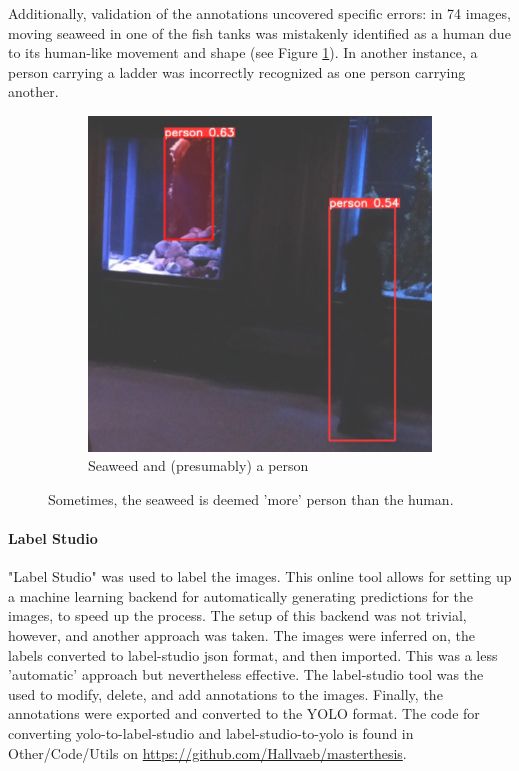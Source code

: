 Additionally, validation of the annotations uncovered specific errors: in 74 images, moving seaweed in one of the fish tanks was mistakenly identified as a human due to its human-like movement and shape (see Figure \ref{fig:seaweed_man}). In another instance, a person carrying a ladder was incorrectly recognized as one person carrying another.

\begin{figure}[H]
    \centering
    \begin{subfigure}{0.60\textwidth}
        \centering
        \includegraphics[width=\textwidth]{Images/Fun/seaweed-man-more-than-I.png}
        \caption{Seaweed and (presumably) a person}
    \end{subfigure}
    \caption{Sometimes, the seaweed is deemed 'more' person than the human.}
    \label{fig:seaweed_man}
\end{figure}

\paragraph{Label Studio}
"Label Studio" was used to label the images. This online tool allows for setting up a machine learning backend for automatically generating predictions for the images, to speed up the process. The setup of this backend was not trivial, however, and another approach was taken. The images were inferred on, the labels converted to label-studio json format, and then imported. This was a less 'automatic' approach but nevertheless effective. The label-studio tool was the used to modify, delete, and add annotations to the images. Finally, the annotations were exported and converted to the YOLO format. The code for converting yolo-to-label-studio and label-studio-to-yolo is found in Other/Code/Utils on \href{https://github.com/Hallvaeb/masterthesis}{https://github.com/Hallvaeb/masterthesis}.

